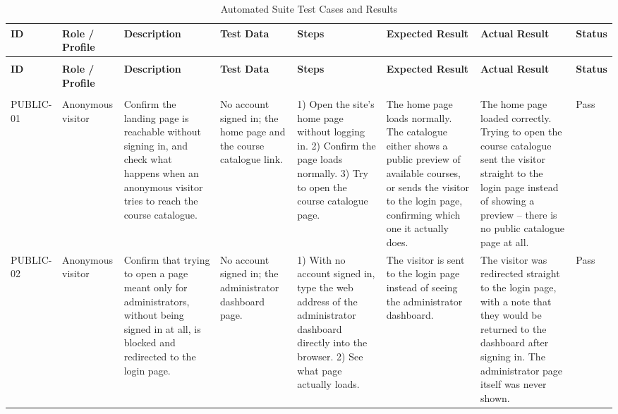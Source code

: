 \documentclass[12pt, oneside]{article} %
\newcommand{\tabbreak}{\hyphenpenalty=200\exhyphenpenalty=200\tolerance=4000\hbadness=10000\hspace{0pt}}
\begin{document}
{
\renewcommand{\arraystretch}{1.25}
\setlength{\tabcolsep}{2pt}
\footnotesize
\begin{landscape}
\begin{longtable}{|>{\raggedright\arraybackslash\tabbreak}p{1.6cm}|>{\raggedright\arraybackslash\tabbreak}p{2.3cm}|>{\raggedright\arraybackslash\tabbreak}p{3.3cm}|>{\raggedright\arraybackslash\tabbreak}p{2.7cm}|>{\raggedright\arraybackslash\tabbreak}p{4.2cm}|>{\raggedright\arraybackslash\tabbreak}p{3.7cm}|>{\raggedright\arraybackslash\tabbreak}p{4.1cm}|>{\raggedright\arraybackslash\tabbreak}p{1.5cm}|}
\caption{Automated Suite Test Cases and Results}
\label{tab:automated_suite}\\
\hline
\textbf{ID} & \textbf{Role / Profile} & \textbf{Description} & \textbf{Test Data} & \textbf{Steps} & \textbf{Expected Result} & \textbf{Actual Result} & \textbf{Status} \\
\hline \hline
\endfirsthead
\multicolumn{8}{l}{\footnotesize\itshape Table~\ref{tab:automated_suite} continued from the previous page}\\
\hline
\textbf{ID} & \textbf{Role / Profile} & \textbf{Description} & \textbf{Test Data} & \textbf{Steps} & \textbf{Expected Result} & \textbf{Actual Result} & \textbf{Status} \\
\hline \hline
\endhead
\hline
\multicolumn{8}{r}{\footnotesize\itshape continued on the next page}\\
\endfoot
\endlastfoot
PUBLIC-01 & Anonymous visitor & Confirm the landing page is reachable without signing in, and check what happens when an anonymous visitor tries to reach the course catalogue. & No account signed in; the home page and the course catalogue link. & 1) Open the site's home page without logging in. 2) Confirm the page loads normally. 3) Try to open the course catalogue page. & The home page loads normally. The catalogue either shows a public preview of available courses, or sends the visitor to the login page, confirming which one it actually does. & The home page loaded correctly. Trying to open the course catalogue sent the visitor straight to the login page instead of showing a preview -- there is no public catalogue page at all. & Pass \\ \hline
PUBLIC-02 & Anonymous visitor & Confirm that trying to open a page meant only for administrators, without being signed in at all, is blocked and redirected to the login page. & No account signed in; the administrator dashboard page. & 1) With no account signed in, type the web address of the administrator dashboard directly into the browser. 2) See what page actually loads. & The visitor is sent to the login page instead of seeing the administrator dashboard. & The visitor was redirected straight to the login page, with a note that they would be returned to the dashboard after signing in. The administrator page itself was never shown. & Pass \\ \hline

\end{longtable}
\end{landscape}}
\end{document}
